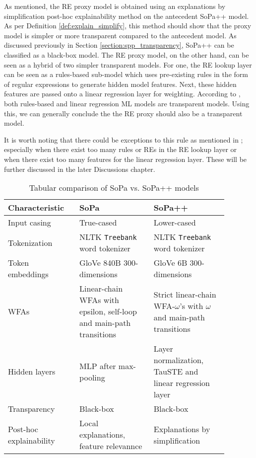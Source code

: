 As mentioned, the RE proxy model is obtained using an explanations by
simplification post-hoc explainability method on the antecedent SoPa++ model. As
per Definition \ref{def:explain_simplify}, this method should show that the
proxy model is simpler or more transparent compared to the antecedent model. As
discussed previously in Section \ref{section:spp_transparency}, SoPa++ can be
classified as a black-box model. The RE proxy model, on the other hand, can be
seen as a hybrid of two simpler transparent models. For one, the RE lookup layer
can be seen as a rules-based sub-model which uses pre-existing rules in the form
of regular expressions to generate hidden model features. Next, these hidden
features are passed onto a linear regression layer for weighting. According to
\citet[Page 7, Section 3]{arrieta2020explainable}, both rules-based and linear
regression ML models are transparent models. Using this, we can generally
conclude the the RE proxy should also be a transparent model.

It is worth noting that there could be exceptions to this rule as mentioned in
\citet[Page 9, Table 2]{arrieta2020explainable}; especially when there exist too
many rules or REs in the RE lookup layer or when there exist too many features
for the linear regression layer. These will be further discussed in the later
Discussions chapter.

\begin{table}[t!]
  \centering {}
  \begin{tabular}{L{0.275\linewidth} L{0.3\linewidth} L{0.3\linewidth}}
    \toprule
    Characteristic & SoPa & SoPa++ \\
    \midrule
    Input casing & True-cased & Lower-cased \\ 
    Tokenization & NLTK \texttt{Treebank} word tokenizer & NLTK \texttt{Treebank} word tokenizer\\
    Token embeddings & GloVe 840B 300-dimensions & GloVe 6B 300-dimensions \\
    WFAs & Linear-chain WFAs with epsilon, self-loop and main-path transitions & Strict linear-chain WFA-$\omega$'s with $\omega$ and main-path transitions \\
    Hidden layers & MLP after max-pooling & Layer normalization, TauSTE and linear regression layer \\
    Transparency & Black-box & Black-box \\
    Post-hoc explainability & Local explanations, feature relevannce & Explanations by simplification \\
    \bottomrule
  \end{tabular}
  \caption{Tabular comparison of SoPa vs. SoPa++ models}
  \label{tab:sopa_spp_comparison}
\end{table}

